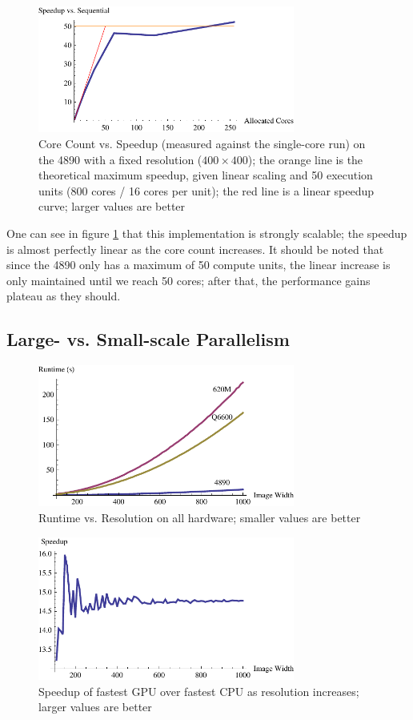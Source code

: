 \documentclass{acmsiggraph}
\begin{document}
\begin{figure}
    \includegraphics[width=84.5mm]{strongPlotTwo.pdf}
    \caption{Core Count vs. Speedup (measured against the single-core run) on the 4890 with a fixed resolution ($400\times400$); the orange line is the theoretical maximum speedup, given linear scaling and 50 execution units (800 cores / 16 cores per unit); the red line is a linear speedup curve; larger values are better}
    \label{fig:strongPlotTwo}
\end{figure}

One can see in figure \ref{fig:strongPlotTwo} that this implementation is strongly scalable; the speedup is almost perfectly linear as the core count increases. It should be noted that since the 4890 only has a maximum of 50 compute units, the linear increase is only maintained until we reach 50 cores; after that, the performance gains plateau as they should.

\subsection{Large- vs. Small-scale Parallelism}

\begin{figure}
    \includegraphics[width=84.5mm]{runtimePlot.pdf}
    \caption{Runtime vs. Resolution on all hardware; smaller values are better}
    \label{fig:runtimePlot}
\end{figure}

\begin{figure}
    \includegraphics[width=84.5mm]{speedupPlot.pdf}
    \caption{Speedup of fastest GPU over fastest CPU as resolution increases; larger values are better}
    \label{fig:speedupPlot}
\end{figure}
\end{document}
